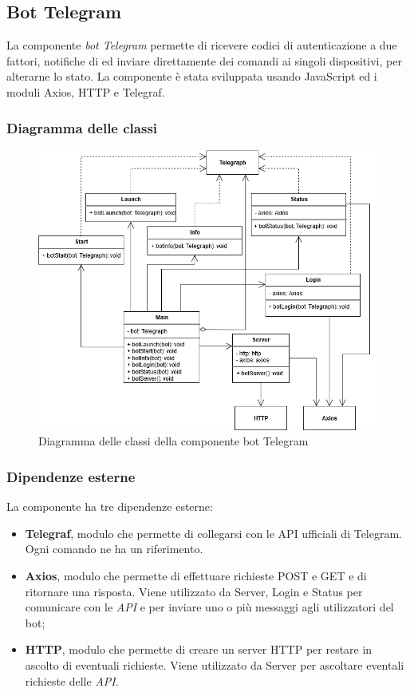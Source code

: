 \subsection{Bot Telegram}
	La componente \textit{bot Telegram} permette di ricevere codici di autenticazione a due fattori, notifiche di  ed inviare direttamente dei comandi ai singoli dispositivi, per alterarne lo stato.
	\newline
	La componente è stata sviluppata usando JavaScript ed i moduli Axios, HTTP e Telegraf.
	 
\subsubsection{Diagramma delle classi}%
	\begin{figure}[H]
		\centering
		\includegraphics[scale=0.600]{res/images/BOTTELEGRAM/ClassiTelegram.png}
		\caption{Diagramma delle classi della componente bot Telegram}
		\label{Diagramma 19}
	\end{figure}
\subsubsection{Dipendenze esterne}	
	La componente ha tre dipendenze esterne:
	\begin{itemize}
		\item \textbf{Telegraf}, modulo che permette di collegarsi con le API ufficiali di Telegram. Ogni comando ne ha un riferimento. 
		\item \textbf{Axios}, modulo che permette di effettuare richieste POST e GET e di ritornare una risposta. Viene utilizzato da Server, Login e Status per comunicare con le \textit{API} e per inviare uno o più messaggi agli utilizzatori del bot;
		\item \textbf{HTTP}, modulo che permette di creare un server HTTP per restare in ascolto di eventuali richieste. Viene utilizzato da Server per ascoltare eventali richieste delle \textit{API}.    
	\end{itemize}
